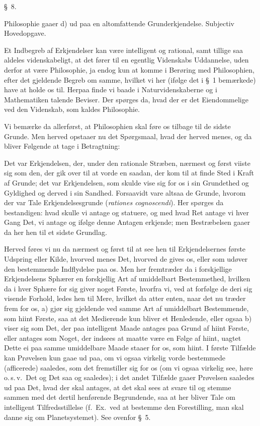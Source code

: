 \documentclass[12pt,a4paper]{book}
\newcommand{\apage}[1]{\marginnote{\footnotesize\textit{[#1]}}}
\begin{document}
\begin{center}\large\S~8.\end{center}
\begin{center}Philosophie \apage{25}  gaaer d) ud paa en altomfattende Grunderkjendelse.
Subjectiv Hovedopgave.\end{center}

Et Indbegreb af Erkjendelser kan være intelligent og rational, samt tillige saa
aldeles videnskabeligt, at det fører til en egentlig Videnskabs Uddannelse, uden
derfor at være Philosophie, ja endog kun at komme i Berøring med Philosophien,
efter det gjeldende Begreb om samme, hvilket vi her (ifølge det i \S~1 bemærkede)
have at holde os til. Herpaa finde vi baade i Naturvidenskaberne og i Mathematiken
talende Beviser. Der spørges da, hvad der er det Eiendommelige ved den Videnskab,
som kaldes Philosophie.

Vi bemærke da allerførst, at Philosophien skal føre os tilbage til de sidste
Grunde. Men herved opstaaer nu det Spørgsmaal, hvad der herved menes, og da bliver
Følgende at tage i Betragtning:

Det var Erkjendelsen, der, under den rationale Stræben, nærmest og først viiste
sig som den, der gik over til at vorde en saadan, der kom til at finde Sted i
Kraft af Grunde; det var Erkjendelsen, som skulde vise sig for os i sin Grundethed
og Gyldighed og derved i sin Sandhed. Forsaavidt vare altsaa de Grunde, hvorom
der var Tale Erkjendelsesgrunde (\textit{rationes cognoscendi}). Her spørges da
bestandigen: hvad skulle vi antage og statuere, og med hvad Ret antage vi hver
Gang Det, vi antage og ifølge denne \apage{26}  Antagen erkjende; men Bestræbelsen gaaer da
her hen til et sidste Grundlag.

Herved føres vi nu da nærmest og først til at see hen til Erkjendelsernes første
Udspring eller Kilde, hvorved menes Det, hvorved de gives os, eller som udøver
den bestemmende Indflydelse paa os. Men her fremtræder da i forskjellige
Erkjendelsens Sphærer en forskjellig Art af umiddelbart Bestemmethed, hvilken da
i hver Sphære for sig giver noget Første, hvorfra vi, ved at forfølge de deri sig
visende Forhold, ledes hen til Mere, hvilket da atter enten, naar det nu træder
frem for os, a) gjør sig gjeldende ved samme Art af umiddelbart Bestemmende, som
hiint Første, saa at det Medierende kun bliver et Henledende, eller ogsaa b) viser
sig som Det, der paa intelligent Maade antages paa Grund af hiint Første, eller
antages som Noget, der indsees at maatte være en Følge af hiint, uagtet Dette ei
paa samme umiddelbare Maade staaer for os, som hiint. I første Tilfælde kan
Prøvelsen kun gaae ud paa, om vi ogsaa virkelig vorde bestemmede (afficerede)
saaledes, som det fremstiller sig for os (om vi ogsaa virkelig see, høre
o.\,s.\,v.\ Det og Det saa og saaledes); i det andet Tilfælde gaaer Prøvelsen
saaledes ud paa Det, hvad der skal antages, at det skal sees at svare til og
stemme sammen med det dertil henførende Begrundende, saa at her bliver Tale om
intelligent Tilfredsstillelse (f.\ Ex.\ ved at bestemme den Forestilling, man skal
danne sig om Planetsystemet). See ovenfor \S~5.
\end{document}
